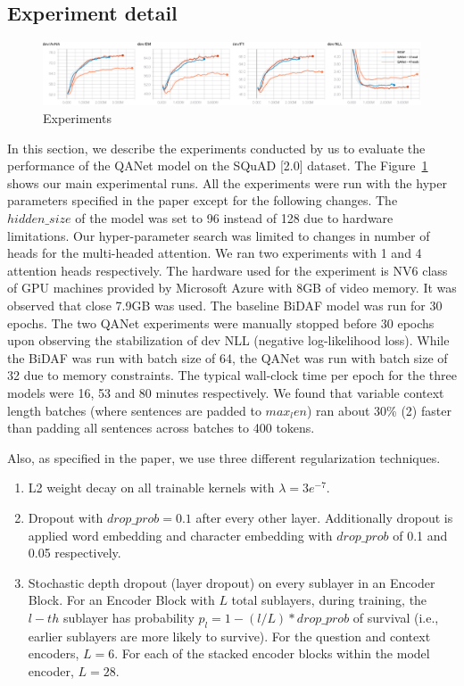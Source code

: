 \documentclass{article}
\begin{document}
\subsection{Experiment detail}
\begin{figure}[h]
  \centering
  \includegraphics[width=\linewidth]{../images/fr_experiment.png}
  \caption{Experiments}
  \label{experiments-figure}
\end{figure} 
In this section, we describe the experiments conducted by us to evaluate the performance of the QANet model on the SQuAD [2.0] dataset. The Figure~\ref{experiments-figure} shows our main experimental runs. All the experiments were run with the hyper parameters specified in the paper except for the following changes. The $hidden\_size$ of the model was set to 96 instead of 128 due to hardware limitations. Our hyper-parameter search was limited to changes in number of heads for the multi-headed attention. We ran two experiments with 1 and 4 attention heads respectively. The hardware used for the experiment is NV6 class of GPU machines provided by Microsoft Azure with 8GB of video memory. It was observed that close 7.9GB was used. The baseline BiDAF model was run for 30 epochs. The two QANet experiments were manually stopped before 30 epochs upon observing the stabilization of dev NLL (negative log-likelihood loss). While the BiDAF was run with batch size of 64, the QANet was run with batch size of 32 due to memory constraints. The typical wall-clock time per epoch for the three models were 16, 53 and 80 minutes respectively. We found that variable context length batches (where sentences are padded to $max_len$) ran about 30\% (2) faster than padding all sentences across batches to 400 tokens.

Also, as specified in the paper, we use three different regularization techniques. 

\begin{enumerate}
  \item L2 weight decay on all trainable kernels with $\lambda = 3e^{-7}$.
  \item Dropout with $drop\_prob = 0.1$ after every other layer. Additionally dropout is applied word embedding and character embedding with $drop\_prob$ of 0.1 and 0.05 respectively.
  \item Stochastic depth dropout (layer dropout) on every sublayer in an Encoder Block. For an Encoder Block with $L$ total sublayers, during training, the $l-th$ sublayer has probability $p_l = 1 - (l/L) * drop\_prob$ of survival (i.e., earlier sublayers are more likely to survive). For the question and context encoders, $L = 6$. For each of the stacked encoder blocks within the model encoder, $L = 28$.
\end{enumerate}	
\end{document}
